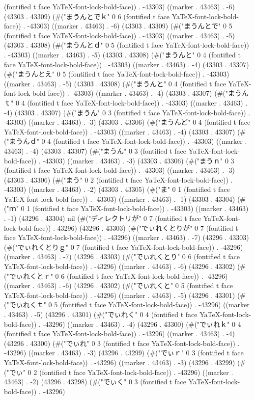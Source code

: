 (fontified t face YaTeX-font-lock-bold-face)) . -43303) ((marker . 43463) . -6) (43303 . 43309) (#("まうんとでｋ" 0 6 (fontified t face YaTeX-font-lock-bold-face)) . -43303) ((marker . 43463) . -6) (43303 . 43309) (#("まうんとで" 0 5 (fontified t face YaTeX-font-lock-bold-face)) . -43303) ((marker . 43463) . -5) (43303 . 43308) (#("まうんとｄ" 0 5 (fontified t face YaTeX-font-lock-bold-face)) . -43303) ((marker . 43463) . -5) (43303 . 43308) (#("まうんと" 0 4 (fontified t face YaTeX-font-lock-bold-face)) . -43303) ((marker . 43463) . -4) (43303 . 43307) (#("まうんとえ" 0 5 (fontified t face YaTeX-font-lock-bold-face)) . -43303) ((marker . 43463) . -5) (43303 . 43308) (#("まうんと" 0 4 (fontified t face YaTeX-font-lock-bold-face)) . -43303) ((marker . 43463) . -4) (43303 . 43307) (#("まうんｔ" 0 4 (fontified t face YaTeX-font-lock-bold-face)) . -43303) ((marker . 43463) . -4) (43303 . 43307) (#("まうん" 0 3 (fontified t face YaTeX-font-lock-bold-face)) . -43303) ((marker . 43463) . -3) (43303 . 43306) (#("まうんど" 0 4 (fontified t face YaTeX-font-lock-bold-face)) . -43303) ((marker . 43463) . -4) (43303 . 43307) (#("まうんｄ" 0 4 (fontified t face YaTeX-font-lock-bold-face)) . -43303) ((marker . 43463) . -4) (43303 . 43307) (#("まうん" 0 3 (fontified t face YaTeX-font-lock-bold-face)) . -43303) ((marker . 43463) . -3) (43303 . 43306) (#("まうｎ" 0 3 (fontified t face YaTeX-font-lock-bold-face)) . -43303) ((marker . 43463) . -3) (43303 . 43306) (#("まう" 0 2 (fontified t face YaTeX-font-lock-bold-face)) . -43303) ((marker . 43463) . -2) (43303 . 43305) (#("ま" 0 1 (fontified t face YaTeX-font-lock-bold-face)) . -43303) ((marker . 43463) . -1) (43303 . 43304) (#("ｍ" 0 1 (fontified t face YaTeX-font-lock-bold-face)) . -43303) ((marker . 43463) . -1) (43296 . 43304) nil (#("ディレクトリが" 0 7 (fontified t face YaTeX-font-lock-bold-face)) . 43296) (43296 . 43303) (#("でぃれくとりが" 0 7 (fontified t face YaTeX-font-lock-bold-face)) . -43296) ((marker . 43463) . -7) (43296 . 43303) (#("でぃれくとりｇ" 0 7 (fontified t face YaTeX-font-lock-bold-face)) . -43296) ((marker . 43463) . -7) (43296 . 43303) (#("でぃれくとり" 0 6 (fontified t face YaTeX-font-lock-bold-face)) . -43296) ((marker . 43463) . -6) (43296 . 43302) (#("でぃれくとｒ" 0 6 (fontified t face YaTeX-font-lock-bold-face)) . -43296) ((marker . 43463) . -6) (43296 . 43302) (#("でぃれくと" 0 5 (fontified t face YaTeX-font-lock-bold-face)) . -43296) ((marker . 43463) . -5) (43296 . 43301) (#("でぃれくｔ" 0 5 (fontified t face YaTeX-font-lock-bold-face)) . -43296) ((marker . 43463) . -5) (43296 . 43301) (#("でぃれく" 0 4 (fontified t face YaTeX-font-lock-bold-face)) . -43296) ((marker . 43463) . -4) (43296 . 43300) (#("でぃれｋ" 0 4 (fontified t face YaTeX-font-lock-bold-face)) . -43296) ((marker . 43463) . -4) (43296 . 43300) (#("でぃれ" 0 3 (fontified t face YaTeX-font-lock-bold-face)) . -43296) ((marker . 43463) . -3) (43296 . 43299) (#("でぃｒ" 0 3 (fontified t face YaTeX-font-lock-bold-face)) . -43296) ((marker . 43463) . -3) (43296 . 43299) (#("でぃ" 0 2 (fontified t face YaTeX-font-lock-bold-face)) . -43296) ((marker . 43463) . -2) (43296 . 43298) (#("でぃく" 0 3 (fontified t face YaTeX-font-lock-bold-face)) . -43296) 